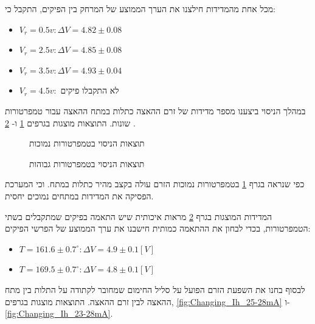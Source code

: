 \documentclass{article}
\begin{document}
מכל אחת מהמדידות חילצנו את הערך הממוצע של המרחק בין הפיקים, התקבל כי:
\begin{itemize}
    \item $V_r=0.5v: \Delta V =4.82 \pm 0.08$
    \item $V_r=2.5v: \Delta V =4.85 \pm 0.08$
    \item $V_r=3.5v: \Delta V =4.93 \pm 0.04$
    \item $V_r=4.5v:$ לא התקבלו פיקים
\end{itemize}


במהלך הניסוי ביצענו מספר מדידות של זרם ההאצה כתלות במתח ההאצה עבור טמפרטורות שונות.
התוצאות מוצגות בגרפים
\ref{graph:Changing_temp_0-10v}
ו-
\ref{graph:Changing_temp_0-30v}
.

\begin{graph}[H]
    \begin{subfigure}[b]{\textwidth}
    	\centering
    	\resizebox{0.95\textwidth}{!}{}
    	\caption{תוצאות הניסוי בטמפרטורות נמוכות}
    	\label{graph:Changing_temp_0-10v}
    \end{subfigure}
    \hfill
    \begin{subfigure}[b]{\textwidth}
    	\centering
    	\resizebox{0.95\textwidth}{!}{}
    	\caption{תוצאות הניסוי בטמפרטורות גבוהות}
    	\label{graph:Changing_temp_0-30v}
    \end{subfigure}
    \label{graph:Changing_temp}
\end{graph}

כפי שנראה בגרף 
\ref{graph:Changing_temp_0-10v}
בטמפרטורות נמוכות הזרם עולה בקצב מהיר כתלות במתח. 
וכי המערכת הפסיקה את המדידות במתחים נמוכים יחסית.

המדידות המוצגות בגרף
\ref{graph:Changing_temp_0-30v}
מראות איכותית שיש התאמה בפיקים שמתקבלים בשתי הטמפרטורות, בכדי לבחון את ההתאמה כמותית חישבנו את ערך הממוצע של הפרשי הפיקים:
\begin{itemize}
    \item $T = 161.6 \pm 0.7 ^{\circ}:\Delta V = 4.9 \pm 0.1  [V]$ 
    \item $T = 169.5 \pm 0.7 ^{\circ}:\Delta V = 4.8 \pm 0.1  [V]$ 
\end{itemize}

לבסוף בחנו את השפעת הזרם הפועל על סליל החימום שמחובר לקתודה על התלות בין מתח ההאצה לבין זרם ההאצה.
התוצאות מוצגות בגרפים,
\ref{fig:Changing_Ih_25-28mA}
ו-
\ref{fig:Changing_Ih_23-28mA}.
\end{document}
